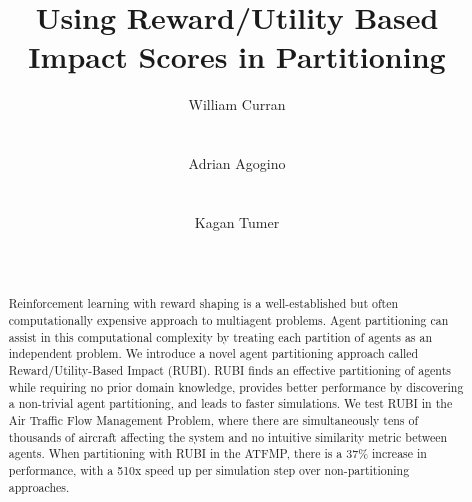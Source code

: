 \documentclass{aamas_extabstract}
\begin{document}



\title{Using Reward/Utility Based Impact Scores in Partitioning}




\author{
\alignauthor
William Curran\\
       \\
       \\
\alignauthor
Adrian Agogino\\
       \\
       \\
\alignauthor 
Kagan Tumer\\
       \\
       \\
}

\maketitle


\begin{abstract}
Reinforcement learning with reward shaping is a well-established but often computationally expensive approach to multiagent problems. Agent partitioning can assist in this computational complexity by treating each partition of agents as an independent problem. We introduce a novel agent partitioning approach called Reward/Utility-Based Impact (RUBI). RUBI finds an effective partitioning of agents while requiring no prior domain knowledge, provides better performance by discovering a non-trivial agent partitioning, and leads to faster simulations. We test RUBI in the Air Traffic Flow Management Problem, where there are simultaneously tens of thousands of aircraft affecting the system and no intuitive similarity metric between agents. When partitioning with RUBI in the ATFMP, there is a 37\% increase in performance, with a 510x speed up per simulation step over non-partitioning approaches.

\end{abstract}
\end{document}

